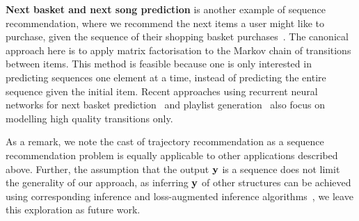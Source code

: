 %
{\bf Next basket and next song prediction}
is another example of sequence recommendation,
where we recommend the next items a user might like to purchase, given the sequence of their shopping basket purchases~\citep{Rendle:2010,Wang:2015}.
The canonical approach here is to apply matrix factorisation to the Markov chain of transitions between items.
This method is feasible because one is only interested in predicting sequences one element at a time, instead of predicting the entire sequence given the initial item.
Recent approaches using recurrent neural networks for
next basket prediction~\cite{yu2016dynamic} and playlist
generation~\cite{choi2016towards} also focus on modelling high quality transitions only.

As a remark, we note the cast of trajectory recommendation as a sequence recommendation problem
is equally applicable to other applications described above.
Further, the assumption that the output $\mathbf{y}$ is a sequence does not limit the generality of our approach,
as inferring $\mathbf{y}$ of other structures can be achieved using corresponding inference and loss-augmented inference algorithms~\cite{joachims2009predicting},
we leave this exploration as future work.


